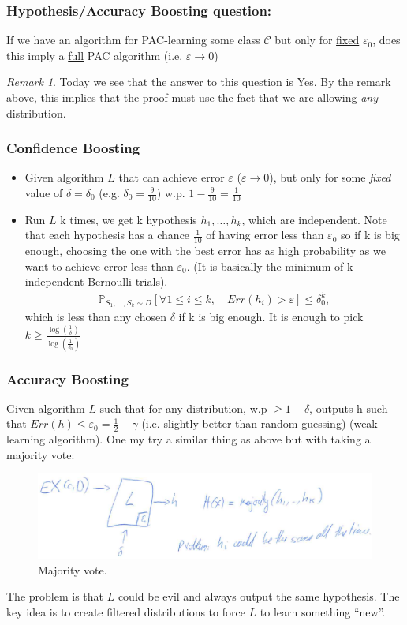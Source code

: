 \documentclass[12pt, letterpaper]{article}
\numberwithin{equation}{section} %
\newcommand{\ul}{\underline}
\newcommand{\mb}{\mathbb}
\newcommand{\mc}{\mathcal}
\newcommand{\ve}{\varepsilon}
\theoremstyle{definition}
\theoremstyle{remark}
\newtheorem{remark}[theorem]{Remark}
\begin{document}
\subsubsection*{Hypothesis/Accuracy Boosting question:}
If we have an algorithm for PAC-learning some class $\mc C$ but only for \ul{fixed} $\ve_0$, does this imply a \ul{full} PAC algorithm (i.e. $\ve\to 0$)
\begin{remark}
Today we see that the answer to this question is Yes. By the remark above, this implies that the proof must use the fact that we are allowing \emph{any} distribution.
\end{remark}

\subsubsection{Confidence Boosting}
\begin{itemize}
\item Given algorithm $L$ that can achieve error $\ve$ ($\ve\to0$), but only for some \emph{fixed} value of $\delta=\delta_0$ (e.g. $\delta_0=\frac9{10}$) w.p. $1 - \frac9{10} = \frac1{10}$
\item Run $L$ k times, we get k hypothesis $h_1,\ldots,h_k$, which are independent. Note that each hypothesis has a chance $\frac1{10}$ of having error less than $\ve_0$ so if k is big enough, choosing the one with the best error has as high probability as we want to achieve error less than $\ve_0$. (It is basically the minimum of k independent Bernoulli trials).
\begin{align}
\mb P_{S_1,\ldots, S_k\sim D}\left[\forall 1\leq i \leq k, \quad Err(h_i)>\ve\right]\leq \delta_0^k,
\end{align}
which is less than any chosen $\delta$ if k is big enough. It is enough to pick $k\geq \frac{\log\left(\frac1\delta\right)}{\log\left(\frac1{\delta_0}\right)}$
\end{itemize}

\subsubsection{Accuracy Boosting}
Given algorithm $L$ such that for any distribution, w.p $\geq 1-\delta$, outputs h such that $Err(h) \leq \ve_0 = \frac12 - \gamma$ (i.e. slightly better than random guessing) (weak learning algorithm). One my try a similar thing as above but with taking a majority vote:
\begin{figure}[H]
\centering
\includegraphics[width=0.6\linewidth]{../img/majority.png}
\caption{Majority vote.}
\end{figure}
The problem is that $L$ could be evil and always output the same hypothesis. The key idea is to create filtered distributions to force $L$ to learn something ``new''.
\end{document}
